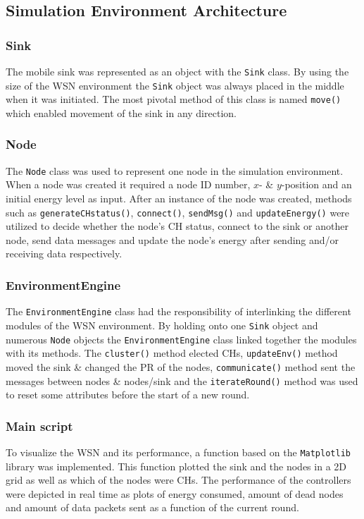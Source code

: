  \subsection{Simulation Environment Architecture}
 \subsubsection{Sink}
 The mobile sink was represented as an object with the \verb!Sink! class. By using the size of the WSN environment the \verb!Sink! object was always placed in the middle when it was initiated. The most pivotal method of this class is named \verb!move()! which enabled movement of the sink in any direction.     

 \subsubsection{Node}
 The \verb!Node! class was used to represent one node in the simulation environment. When a node was created it required a node ID number, $x$- \& $y$-position and an initial energy level as input. After an instance of the node was created, methods such as \verb!generateCHstatus()!, \verb!connect()!, \verb!sendMsg()! and \verb!updateEnergy()! were utilized to decide whether the node's CH status, connect to the sink or another node, send data messages and update the node's energy after sending and/or receiving data respectively. 

 \subsubsection{EnvironmentEngine}
 \noindent The \verb!EnvironmentEngine! class had the responsibility of interlinking the different modules of the WSN environment. By holding onto one \verb!Sink! object and numerous \verb!Node! objects the \verb!EnvironmentEngine! class linked together the modules with its methods. The \verb!cluster()! method elected CHs, \verb!updateEnv()! method moved the sink \& changed the PR of the nodes, \verb!communicate()! method sent the messages between nodes \& nodes/sink and the \verb!iterateRound()! method was used to reset some attributes before the start of a new round.

\subsubsection{Main script}
To visualize the WSN and its performance, a function based on the \verb!Matplotlib! library was implemented. This function plotted the sink and the nodes in a 2D grid as well as which of the nodes were CHs. The performance of the controllers were depicted in real time as plots of energy consumed, amount of dead nodes and amount of data packets sent as a function of the current round. \newline

